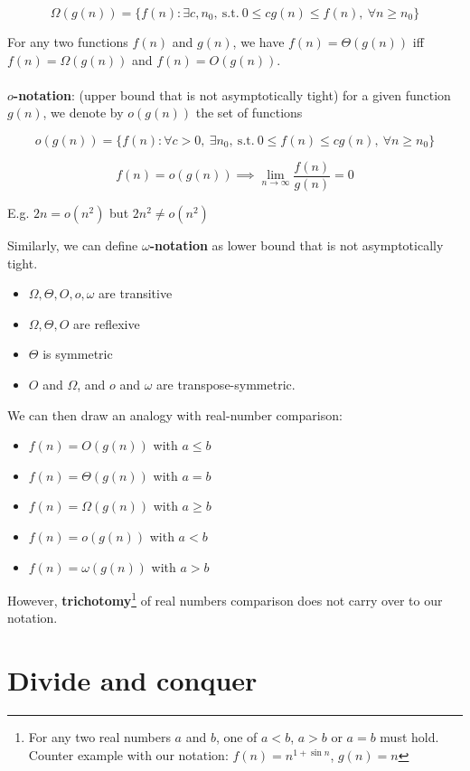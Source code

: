 \documentclass{article}
\begin{document}
$$
\Omega(g(n)) = \{ f(n): \exists c, n_0, ~ \text{s.t.} ~ 0 \leq c g(n) \leq f(n), ~ \forall n \geq n_0 \}
$$

For any two functions $f(n)$ and $g(n)$, we have $f(n) = \Theta(g(n))$ iff $f(n) = \Omega(g(n))$ and $f(n) = O(g(n))$.
\\
\\
\textbf{$o$-notation}: (upper bound that is not asymptotically tight) for a given function $g(n)$, we denote by $o(g(n))$ the set of functions

$$
o(g(n)) = \{ f(n): \forall c > 0, ~ \exists n_0, ~ \text{s.t.} ~ 0 \leq f(n) \leq c g(n), ~ \forall n \geq n_0 \}
$$

$$
f(n) = o(g(n)) \implies \lim\limits_{n \to \infty}{\frac{f(n)}{g(n)}} = 0
$$

E.g. $2 n = o(n^2)$ but $2 n^2 \neq o(n^2)$

Similarly, we can define \textbf{$\omega$-notation} as lower bound that is not asymptotically tight.

\begin{itemize}
  \item $\Omega, \Theta, O, o, \omega$ are transitive
  \item $\Omega, \Theta, O$ are reflexive
  \item $\Theta$ is symmetric
  \item $O$ and $\Omega$, and $o$ and $\omega$ are transpose-symmetric.
\end{itemize}

We can then draw an analogy with real-number comparison:

\begin{itemize}
  \item $f(n) = O(g(n))$ with $a \leq b$
  \item $f(n) = \Theta(g(n))$ with $a = b$
  \item $f(n) = \Omega(g(n))$ with $a \geq b$
  \item $f(n) = o(g(n))$ with $a < b$
  \item $f(n) = \omega(g(n))$ with $a > b$
\end{itemize}

However, \textbf{trichotomy}\footnote{For any two real numbers $a$ and $b$, one of $a < b$, $a > b$ or $a = b$ must hold. Counter example with our notation: $f(n) = n^{1 + \sin{n}}$, $g(n) = n$} of real numbers comparison does not carry over to our notation.

\section{Divide and conquer}
\end{document}
